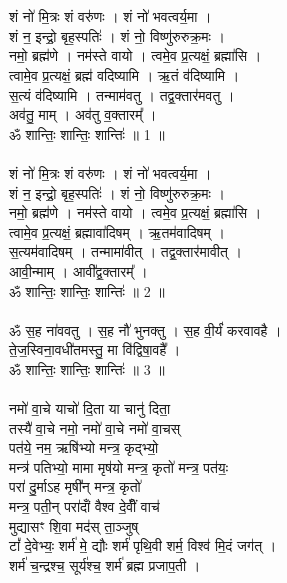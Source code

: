 \section{}
शं नो॑ मि॒त्रः शं वरु॑णः । शं नो॑ भवत्वर्य॒मा ।\\
शं न॒ इन्द्रो॒ बृह॒स्पतिः॑ । शं नो॒ विष्णु॑रुरुक्र॒मः ।\\
नमो॒ ब्रह्म॑णे । नम॑स्ते वायो । त्वमे॒व प्र॒त्यक्षं॒ ब्रह्मा॑सि ।\\
त्वामे॒व प्र॒त्यक्षं॒ ब्रह्म॑ वदिष्यामि । ऋ॒तं व॑दिष्यामि ।\\
स॒त्यं व॑दिष्यामि । तन्माम॑वतु । तद्व॒क्तार॑मवतु ।\\
अव॑तु॒ माम् । अव॑तु व॒क्तारम्᳚ ।\\
ॐ शान्तिः॒ शान्तिः॒ शान्तिः॑ ॥ 1 ॥\\
\\
शं नो॑ मि॒त्रः शं वरु॑णः । शं नो॑ भवत्वर्य॒मा ।\\
शं न॒ इन्द्रो॒ बृह॒स्पतिः॑ । शं नो॒ विष्णु॑रुरुक्र॒मः ।\\
नमो॒ ब्रह्म॑णे । नम॑स्ते वायो । त्वमे॒व प्र॒त्यक्षं॒ ब्रह्मा॑सि ।\\
त्वामे॒व प्र॒त्यक्षं॒ ब्रह्मावा॑दिषम् । ऋ॒तम॑वादिषम् ।\\
स॒त्यम॑वादिषम् । तन्मामा॑वीत् । तद्व॒क्तार॑मावीत् ।\\
आवी॒न्माम् । आवी᳚द्व॒क्तारम्᳚ ।\\
ॐ शान्तिः॒ शान्तिः॒ शान्तिः॑ ॥ 2 ॥\\
\\
ॐ स॒ह ना॑ववतु । स॒ह नौ॑ भुनक्तु । स॒ह वी॒र्यं॑ करवावहै ।\\
ते॒ज॒स्विना॒वधी॑तमस्तु॒ मा वि॑द्विषा॒वहै᳚ ।\\
ॐ शान्तिः॒ शान्तिः॒ शान्तिः॑ ॥ 3 ॥\\
\\
नमो॑ वा॒चे याचो॑ दि॒ता या चानु॑ दिता॒\\
तस्यै॑ वा॒चे नमो॒ नमो॑ वा॒चे नमो॑ वा॒चस् \\
पत॑ये॒ नम॒ ऋषि॑भ्यो मन्त्र॒ कृद्भ्यो॒\\
मन्त्र॑ पतिभ्यो॒ मामा मृष॑यो मन्त्र॒ कृतो॑ मन्त्र॒ पत॑यः॒\\
परा॑ दु॒र्माऽह मृषी᳚न् मन्त्र॒ कृतो॑\\
मन्त्र॒ पती॒न् परा॑दांँ वैश्व दे॒वींँ वाच॑  \\
मुद्यासꣳ शि॒वा मद॑स् ता॒ञ्जुष् \\
टां᳚ दे॒वेभ्यः॒ शर्म॑ मे॒ द्यौः शर्म॑ पृथि॒वी शर्म॒ विश्व॑ मि॒दं जग॑त् ।\\
शर्म॑ च॒न्द्रश्च॒ सूर्य॑श्च॒ शर्म॑ ब्रह्म प्रजाप॒ती ।\\
